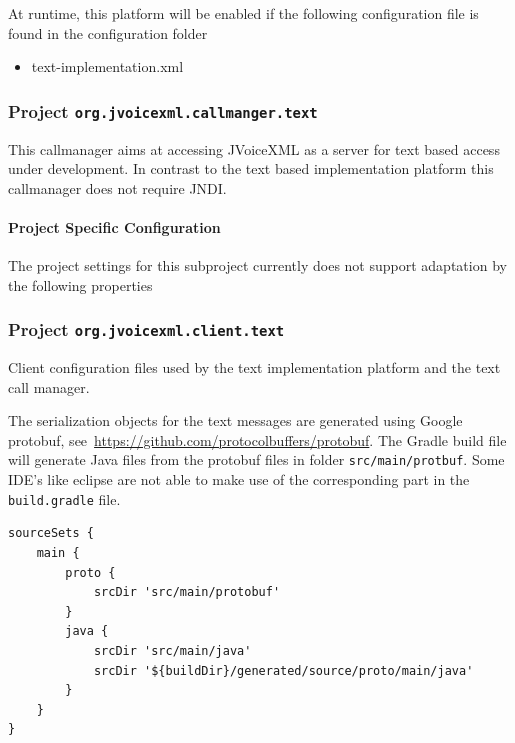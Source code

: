 \documentclass[11pt,a4paper]{article}
\begin{document}
At runtime, this platform will be enabled if the following configuration file is found in the configuration
folder
\begin{itemize}
\item text-implementation.xml
\end{itemize}

\subsubsection{Project \texttt{org.jvoicexml.callmanger.text}}

This callmanager aims at accessing JVoiceXML as a server for text based
access under development. In contrast to the text based implementation platform this callmanager
does not require JNDI.

\paragraph{Project Specific Configuration}

The project settings for this subproject currently does not support adaptation by the following
properties

\subsubsection{Project \texttt{org.jvoicexml.client.text}}

Client configuration files used by the text implementation platform and the text call manager.

The serialization objects for the text messages are generated using 
Google protobuf, see~\url{https://github.com/protocolbuffers/protobuf}. 
The Gradle build file will generate Java files from the protobuf files
in folder \texttt{src/main/protbuf}.
Some IDE's like eclipse are not able to make use of the corresponding
part in the \texttt{build.gradle} file.
\begin{lstlisting} 
sourceSets {
    main {
        proto {
            srcDir 'src/main/protobuf'
        }
        java {
            srcDir 'src/main/java'
            srcDir '${buildDir}/generated/source/proto/main/java'
        }
    }
}
\end{lstlisting}
\end{document}
